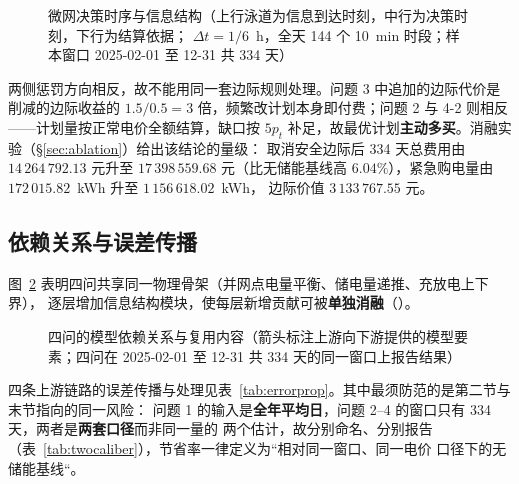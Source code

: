 \begin{figure}[htbp]
  \centering
  
  \caption{微网决策时序与信息结构（上行泳道为信息到达时刻，中行为决策时刻，下行为结算依据；
            \(\Delta t=1/6\)~h，全天 144 个 10~min 时段；样本窗口 2025-02-01 至 12-31 共 334 天）}
  \label{fig:timeline}
\end{figure}

两侧惩罚方向相反，故不能用同一套边际规则处理。问题 3 中追加的边际代价是削减的边际收益的
\(1.5/0.5=3\) 倍，频繁改计划本身即付费；问题 2 与 4-2 则相反——计划量按正常电价全额结算，缺口按
\(5p_t\) 补足，故最优计划\textbf{主动多买}。消融实验（\S\ref{sec:ablation}）给出该结论的量级：
取消安全边际后 334 天总费用由 \(14\,264\,792.13\) 元升至 \(17\,398\,559.68\) 元（比无储能基线高
\(6.04\%\)），紧急购电量由 \(172\,015.82\)~kWh 升至 \(1\,156\,618.02\)~kWh，
边际价值 \(3\,133\,767.55\) 元。

\subsection{依赖关系与误差传播}

图~\ref{fig:dependency} 表明四问共享同一物理骨架（并网点电量平衡、储电量递推、充放电上下界），
逐层增加信息结构模块，使每层新增贡献可被\textbf{单独消融}（）。

\begin{figure}[htbp]
  \centering
  
  \caption{四问的模型依赖关系与复用内容（箭头标注上游向下游提供的模型要素；四问在 2025-02-01 至
            12-31 共 334 天的同一窗口上报告结果）}
  \label{fig:dependency}
\end{figure}

四条上游链路的误差传播与处理见表~\ref{tab:errorprop}。其中最须防范的是第二节与末节指向的同一风险：
问题 1 的输入是\textbf{全年平均日}，问题 2--4 的窗口只有 334 天，两者是\textbf{两套口径}而非同一量的
两个估计，故分别命名、分别报告（表~\ref{tab:twocaliber}），节省率一律定义为“相对同一窗口、同一电价
口径下的无储能基线“。

